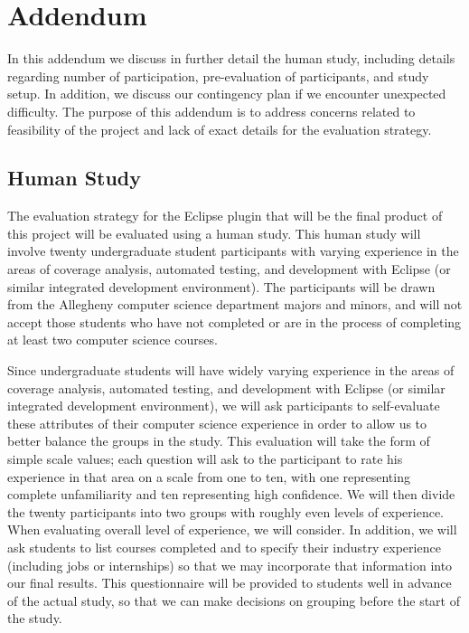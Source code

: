 %
%

\chapter{Addendum}\label{appa:add}


In this addendum we discuss in further detail the human study, including
details regarding number of participation, pre-evaluation of participants,
and study setup.  In addition, we discuss our contingency plan if we
encounter unexpected difficulty.  The purpose of this addendum is to address
concerns related to feasibility of the project and lack of exact details for
the evaluation strategy.

\section{Human Study}\label{sec:addhs}

The evaluation strategy for the Eclipse plugin that will be the final product
of this project will be evaluated using a human study.  This human study will
involve twenty undergraduate student participants with varying experience in
the areas of coverage analysis, automated testing, and development with Eclipse
(or similar integrated development environment).  The participants will be drawn 
from the Allegheny computer science department majors and minors, and will not
accept those students who have not completed or are in the process of completing
at least two computer science courses.

Since undergraduate students will have widely varying experience in
the areas of coverage analysis, automated testing, and development with Eclipse
(or similar integrated development environment), we will ask participants
to self-evaluate these attributes of their computer science experience in order
to allow us to better balance the groups in the study.  This evaluation will
take the form of simple scale values; each question will ask to the participant
to rate his experience in that area on a scale from one to ten, with one representing
complete unfamiliarity and ten representing high confidence.  We will then divide
the twenty participants into two groups with roughly even levels of experience.  
When evaluating overall level of experience, we will consider.  In addition,
we will ask students to list courses completed and to specify their industry
experience (including jobs or internships) so that we may incorporate that information
into our final results.  This questionnaire will be provided to students well in advance
of the actual study, so that we can make decisions on grouping before the start of
the study.

